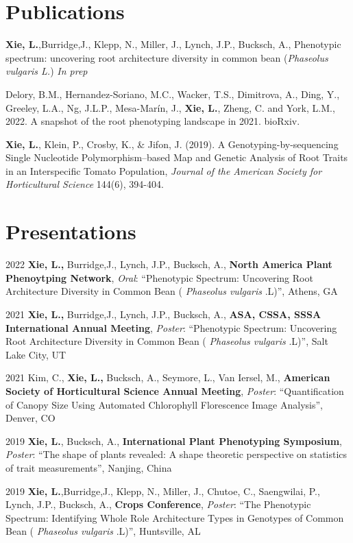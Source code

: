 \documentclass[11pt,a4paper,]{awesome-cv}
\begin{document}
\hypertarget{publications}{%
\section{Publications}\label{publications}}

\textbf{Xie, L.},Burridge,J., Klepp, N., Miller, J., Lynch, J.P.,
Bucksch, A., Phenotypic spectrum: uncovering root architecture diversity
in common bean (\emph{Phaseolus vulgaris L.}) \emph{In prep}

Delory, B.M., Hernandez-Soriano, M.C., Wacker, T.S., Dimitrova, A.,
Ding, Y., Greeley, L.A., Ng, J.L.P., Mesa-Marín, J., \textbf{Xie, L.},
Zheng, C. and York, L.M., 2022. A snapshot of the root phenotyping
landscape in 2021. bioRxiv.

\textbf{Xie, L.}, Klein, P., Crosby, K., \& Jifon, J. (2019). A
Genotyping-by-sequencing Single Nucleotide Polymorphism--based Map and
Genetic Analysis of Root Traits in an Interspecific Tomato Population,
\emph{Journal of the American Society for Horticultural Science} 144(6),
394-404.

\hypertarget{presentations}{%
\section{Presentations}\label{presentations}}

2022 \textbf{Xie, L.,} Burridge,J., Lynch, J.P., Bucksch, A.,
\textbf{North America Plant Phenoytping Network}, \emph{Oral}:
``Phenotypic Spectrum: Uncovering Root Architecture Diversity in Common
Bean ( \emph{Phaseolus vulgaris} .L)'', Athens, GA

2021 \textbf{Xie, L.,} Burridge,J., Lynch, J.P., Bucksch, A.,
\textbf{ASA, CSSA, SSSA International Annual Meeting}, \emph{Poster}:
``Phenotypic Spectrum: Uncovering Root Architecture Diversity in Common
Bean ( \emph{Phaseolus vulgaris} .L)'', Salt Lake City, UT

2021 Kim, C., \textbf{Xie, L.,} Bucksch, A., Seymore, L., Van Iersel,
M., \textbf{American Society of Horticultural Science Annual Meeting},
\emph{Poster}: ``Quantification of Canopy Size Using Automated
Chlorophyll Florescence Image Analysis'', Denver, CO

2019 \textbf{Xie, L.}, Bucksch, A., \textbf{International Plant
Phenotyping Symposium}, \emph{Poster}: ``The shape of plants revealed: A
shape theoretic perspective on statistics of trait measurements'',
Nanjing, China

2019 \textbf{Xie, L.},Burridge,J., Klepp, N., Miller, J., Chutoe, C.,
Saengwilai, P., Lynch, J.P., Bucksch, A., \textbf{Crops Conference},
\emph{Poster}: ``The Phenotypic Spectrum: Identifying Whole Role
Architecture Types in Genotypes of Common Bean ( \emph{Phaseolus
vulgaris} .L)'', Huntsville, AL
\end{document}
